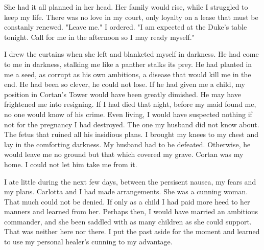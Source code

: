 \documentclass{article}
\begin{document}
She had it all planned in her head. Her family would rise, while I struggled to keep my life. There was no love in my court, only loyalty on a lease that must be constanly renewed. "Leave me." I ordered. "I am expected at the Duke's table tonight. Call for me in the afternoon so I may ready myself."

I drew the curtains when she left and blanketed myself in darkness. He had come to me in darkness, stalking me like a panther stalks its prey. He had planted in me a seed, as corrupt as his own ambitions, a disease that would kill me in the end. He had been so clever, he could not lose. If he had given me a child, my position in Cortan's Tower would have been greatly dimished. He may have frightened me into resigning. If I had died that night, before my maid found me, no one would know of his crime. Even living, I would have suspected nothing if not for the pregnancy I had destroyed. The one my husband did not know about. The fetus that ruined all his insidious plans. I brought my knees to my chest and lay in the comforting darkness. My husband had to be defeated. Otherwise, he would leave me no ground but that which covered my grave. Cortan was my home. I could not let him take me from it. 

\vspace{.5cm}

I ate little during the next few days, between the persisent nausea, my fears and my plans. Carlotta and I had made arrangements. She was a cunning woman. That much could not be denied. If only as a child I had paid more heed to her manners and learned from her. Perhaps then, I would have married an ambitious commander, and she been saddled with as many children as she could support. That was neither here nor there. I put the past aside for the moment and learned to use my personal healer's cunning to my advantage.
\end{document}
